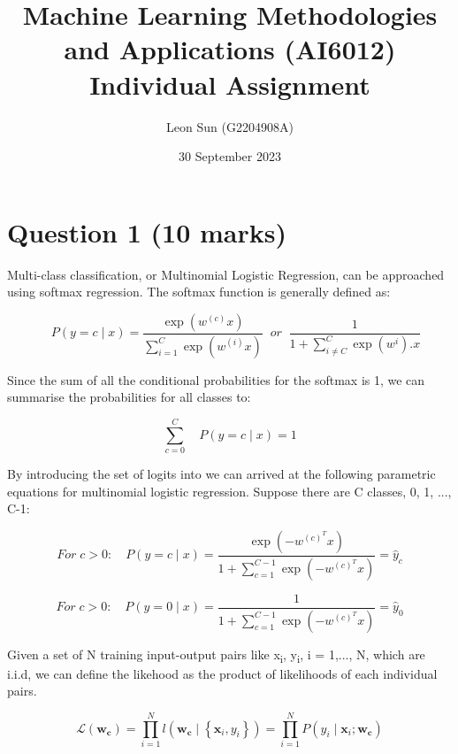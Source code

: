 \documentclass{article}
\title{ Machine Learning Methodologies and Applications (AI6012) Individual Assignment}
\author{Leon Sun (G2204908A)}
\date{30 September 2023}
\begin{document}
\maketitle
 

\section{Question 1 (10 marks)}

Multi-class classification, or Multinomial Logistic Regression, can be approached using softmax regression. The softmax function is generally defined as:

\begin{equation}
    \quad P(y=c \mid x)=\frac{\exp \left(w^{(c)} x\right)}{\sum_{i=1}^{C} \exp \left(w^{(i)} x\right)}\;\;or\;\;\frac{1}{1+\sum_{i\neq C}^{C} \exp \left(w^{i}\right).x}
\end{equation}
\linebreak

Since the sum of all the conditional probabilities for the softmax is 1, we can summarise the probabilities for all classes to:

\begin{equation}
    \sum_{c=0}^{C} \quad P(y=c \mid x)=1
\end{equation}

By introducing the set of logits into we can arrived at the following parametric equations for multinomial logistic regression. Suppose there are C classes, {0, 1, ..., C-1}:

\begin{equation}
    For\;c>0: \quad P(y=c \mid x)=\frac{\exp \left(-w^{(c)^T} x\right)}{1+\sum_{c=1}^{C-1} \exp \left(-w^{(c)^T} x\right)}=\hat{y}_c
\end{equation}

\begin{equation}
    For\;c>0: \quad P(y=0 \mid x)=\frac{1}{1+\sum_{c=1}^{C-1} \exp \left(-w^{(c)^T} x\right)}=\hat{y}_0
\end{equation}

Given a set of N training input-output pairs like {x\textsubscript{i}, y\textsubscript{i}}, i = 1,..., N, which are i.i.d, we can define the likehood as the product of likelihoods of each individual pairs.

\begin{equation}
    \mathcal{L}(\boldsymbol{w_c})=\prod_{i=1}^N l\left(\boldsymbol{w_c} \mid\left\{\boldsymbol{x}_i, y_i\right\}\right)=\prod_{i=1}^N P\left(y_i \mid \boldsymbol{x}_i ; \boldsymbol{w_c}\right)
    \end{equation}
\end{document}
